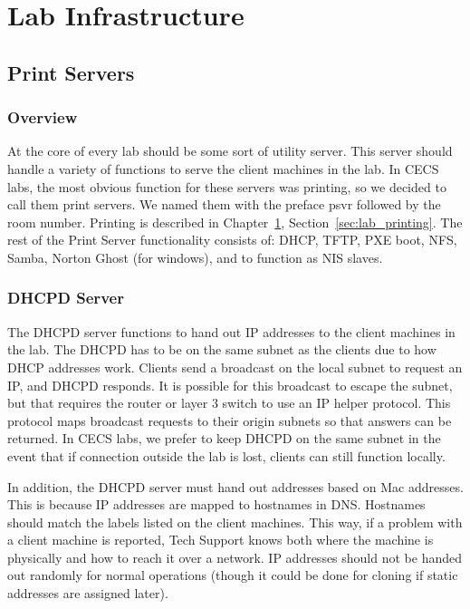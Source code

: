 \chapter{Lab Infrastructure} \label{ch:lab_infrastructure}
\section{Print Servers} \label{sec:printservers}
\subsection{Overview}
At the core of every lab should be some sort of utility server.  This server should handle a variety of functions to serve the client machines in the lab.  In CECS labs, the most obvious function for these servers was printing, so we decided to call them print servers. We named them with the preface psvr followed by the room number.  Printing is described in Chapter~\ref{ch:lab_infrastructure}, Section~\ref{sec:lab_printing}.  The rest of the Print Server functionality consists of:  DHCP, TFTP, PXE boot, NFS, Samba, Norton Ghost (for windows), and to function as NIS slaves.
\subsection{DHCPD Server}
The DHCPD server functions to hand out IP addresses to the client machines in the lab.  The DHCPD has to be on the same subnet as the clients due to how DHCP addresses work.  Clients send a broadcast on the local subnet to request an IP, and DHCPD responds.  It is possible for this broadcast to escape the subnet, but that requires the router or layer 3 switch to use an IP helper protocol.  This protocol maps broadcast requests to their origin subnets so that answers can be returned.  In CECS labs, we prefer to keep DHCPD on the same subnet in the event that if connection outside the lab is lost, clients can still function locally.  

In addition, the DHCPD server must hand out addresses based on Mac addresses.  This is because IP addresses are mapped to hostnames in DNS.  Hostnames should match the labels listed on the client machines.  This way, if a problem with a client machine is reported, Tech Support knows both where the machine is physically and how to reach it over a network.  IP addresses should not be handed out randomly for normal operations (though it could be done for cloning if static addresses are assigned later).  

